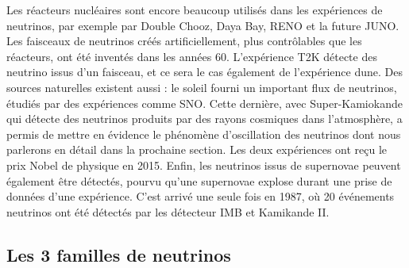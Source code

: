 		    Les réacteurs nucléaires sont encore beaucoup utilisés dans les expériences de neutrinos, par exemple par Double Chooz\cite{Crespo-Anadon2014}, Daya Bay\cite{An2014}, RENO\cite{Collaboration2010} et la future JUNO\cite{An2015}. Les faisceaux de neutrinos créés artificiellement, plus contrôlables que les réacteurs, ont été inventés dans les années 60. L'expérience T2K\cite{Abe2018} détecte des neutrino issus d'un faisceau, et ce sera le cas également de l'expérience \gls{dune}\cite{Strait2016}. Des sources naturelles existent aussi : le soleil fourni un important flux de neutrinos, étudiés par des expériences comme SNO\cite{Aharmim2013}. Cette dernière, avec Super-Kamiokande\cite{Fukuda1998} qui détecte des neutrinos produits par des rayons cosmiques dans l'atmosphère, a permis de mettre en évidence le phénomène d'oscillation des neutrinos dont nous parlerons en détail dans la prochaine section. Les deux expériences ont reçu le prix Nobel de physique en 2015. Enfin, les neutrinos issus de supernovae peuvent également être détectés, pourvu qu'une supernovae explose durant une prise de données d'une expérience. C'est arrivé une seule fois en 1987, où 20 événements neutrinos ont été détectés par les détecteur IMB et Kamikande II\cite{Hirata1987}.

		\subsection{Les 3 familles de neutrinos}
		
